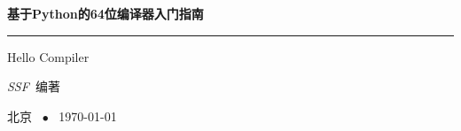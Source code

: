 \begin{titlepage}
  \vspace*{25ex}

  \hspace{0.05\textwidth}\begin{minipage}{.9\textwidth}
    \flushright

    {\textbf{基于Python的64位编译器入门指南}}

    \rule{\linewidth}{.5pt}

    \vspace{2ex}

    {\textsf{Hello Compiler}} \\

    \vspace{20ex}

    {\textit{SSF}~编著}
  \end{minipage}

  \vfill

  \centering
  {北京 ~$\bullet$ ~\today}
\end{titlepage}